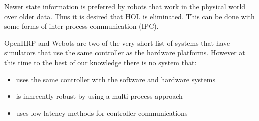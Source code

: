 Newer state information is preferred by robots that work in the physical world over older data.  
Thus it is desired that HOL is eliminated.
This can be done with some forms of inter-process communication (IPC).

OpenHRP and Webots\cite{Webots} are two of the very short list of systems that have simulators that use the same controller as the hardware platforms.
However at this time to the best of our knowledge there is no system that:
\begin{itemize}
\item uses the same controller with the software and hardware systems
\item is inhreently robust by using a multi-process approach
\item uses low-latency methods for controller communications 
\end{itemize}





